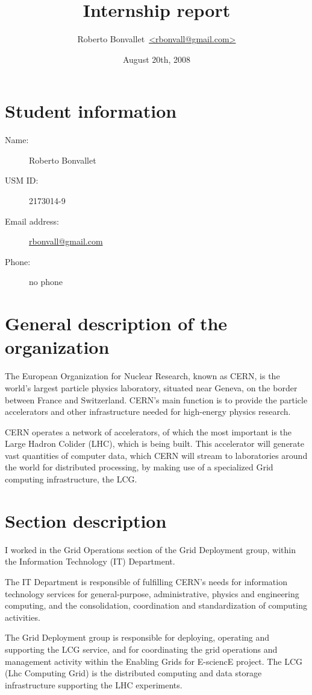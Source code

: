 \documentclass[12pt]{article}
\title{Internship report}
\author{Roberto Bonvallet~\url{<rbonvall@gmail.com>}}
\date{August 20th, 2008}
\begin{document}
  \maketitle

  \section{Student information}
  \begin{description}
    \item[Name:] Roberto Bonvallet
    \item[USM ID:] 2173014-9
    \item[Email address:] \url{rbonvall@gmail.com}
    \item[Phone:] no phone
  \end{description}

  \section{General description of the organization}
    The European Organization for Nuclear Research, known as CERN, is the
    world's largest particle physics laboratory, situated near Geneva,
    on the border between France and Switzerland.  CERN's main function is to
    provide the particle accelerators and other infrastructure needed for
    high-energy physics research.

    CERN operates a network of accelerators, of which the most important is the
    Large Hadron Colider (LHC), which is being built.  This accelerator will
    generate vast quantities of computer data, which CERN will stream to
    laboratories around the world for distributed processing, by making use of
    a specialized Grid computing infrastructure, the LCG.

  \section{Section description}
    I worked in the Grid Operations section of the Grid Deployment
    group, within the Information Technology (IT) Department.

    The IT Department is responsible of fulfilling CERN's needs for information
    technology services for general-purpose, administrative, physics and
    engineering computing, and the consolidation, coordination and
    standardization of computing activities.

    The Grid Deployment group is responsible for deploying, operating and
    supporting the LCG service, and for coordinating the grid operations and
    management activity within the Enabling Grids for E-sciencE project. 
    The LCG ({\sc Lhc} Computing Grid) is the distributed computing and data
    storage infrastructure supporting the LHC experiments.
\end{document}
